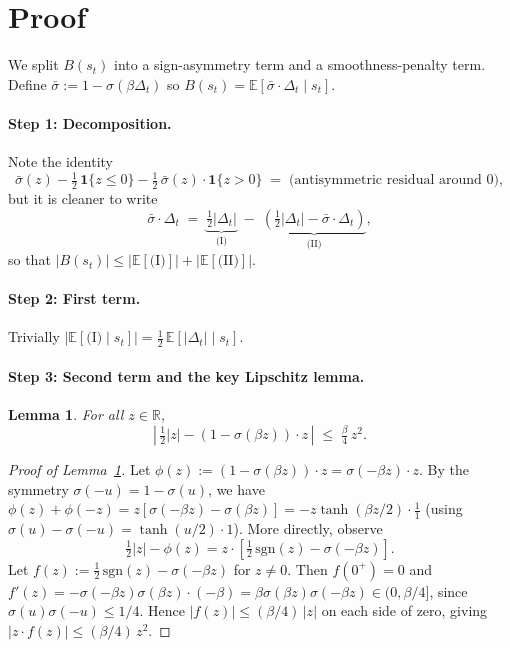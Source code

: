 \documentclass[11pt]{article}
\newtheorem{lemma}{Lemma}
\begin{document}
\section*{Proof}

We split $B(s_t)$ into a sign-asymmetry term and a smoothness-penalty term. Define $\bar \sigma := 1 - \sigma(\beta \Delta_t)$ so $B(s_t) = \mathbb{E}[\bar\sigma \cdot \Delta_t \mid s_t]$.

\paragraph{Step 1: Decomposition.} Note the identity
\[
\bar\sigma(z) - \tfrac{1}{2}\,\mathbf{1}\{z \leq 0\} - \tfrac{1}{2}\,\bar\sigma(z) \cdot \mathbf{1}\{z > 0\} \;=\; \text{(antisymmetric residual around 0)},
\]
but it is cleaner to write
\[
\bar\sigma \cdot \Delta_t \;=\; \underbrace{\tfrac{1}{2}|\Delta_t|}_{\text{(I)}} \;-\; \underbrace{\left(\tfrac{1}{2}|\Delta_t| - \bar\sigma \cdot \Delta_t\right)}_{\text{(II)}},
\]
so that $|B(s_t)| \leq |\mathbb{E}[\text{(I)}]| + |\mathbb{E}[\text{(II)}]|$.

\paragraph{Step 2: First term.} Trivially $|\mathbb{E}[\text{(I)} \mid s_t]| = \tfrac{1}{2}\, \mathbb{E}[|\Delta_t| \mid s_t]$.

\paragraph{Step 3: Second term and the key Lipschitz lemma.}

\begin{lemma}\label{lem:lip}
For all $z \in \mathbb{R}$,
\[
\left|\, \tfrac{1}{2}|z| - (1 - \sigma(\beta z)) \cdot z \,\right| \;\leq\; \tfrac{\beta}{4}\, z^2.
\]
\end{lemma}

\begin{proof}[Proof of Lemma~\ref{lem:lip}]
Let $\phi(z) := (1 - \sigma(\beta z)) \cdot z = \sigma(-\beta z) \cdot z$. By the symmetry $\sigma(-u) = 1 - \sigma(u)$, we have $\phi(z) + \phi(-z) = z[\sigma(-\beta z) - \sigma(\beta z)] = -z \tanh(\beta z / 2) \cdot \tfrac{1}{1}$ (using $\sigma(u) - \sigma(-u) = \tanh(u/2) \cdot 1$). More directly, observe
\[
\tfrac{1}{2}|z| - \phi(z) = z \cdot \left[\tfrac{1}{2}\, \mathrm{sgn}(z) - \sigma(-\beta z)\right].
\]
Let $f(z) := \tfrac{1}{2}\,\mathrm{sgn}(z) - \sigma(-\beta z)$ for $z \neq 0$. Then $f(0^+) = 0$ and $f'(z) = -\sigma(-\beta z)\sigma(\beta z) \cdot (-\beta) = \beta \sigma(\beta z) \sigma(-\beta z) \in (0, \beta/4]$, since $\sigma(u)\sigma(-u) \leq 1/4$. Hence $|f(z)| \leq (\beta/4)\,|z|$ on each side of zero, giving $|z \cdot f(z)| \leq (\beta/4)\, z^2$.
\end{proof}
\end{document}
